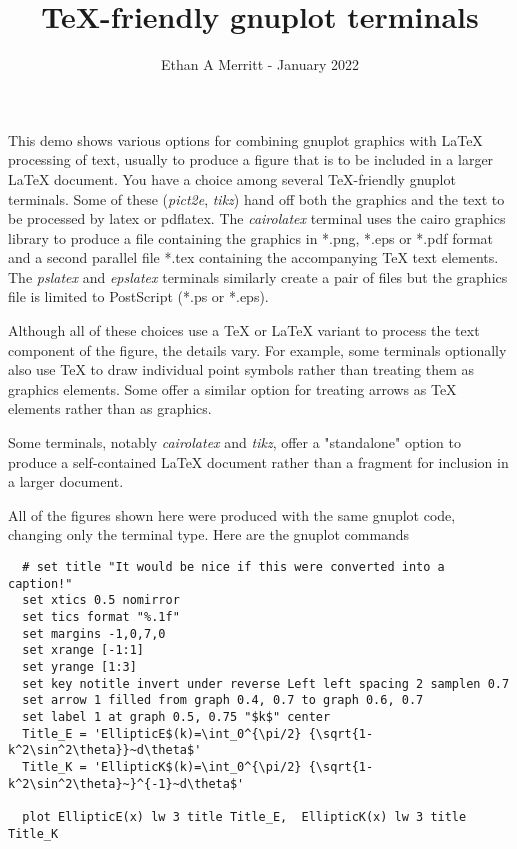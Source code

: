 \documentclass[letterpaper,11pt]{article}
\begin{document}
\title {\vspace{-.75in} \TeX-friendly gnuplot terminals \vspace{-5pt}}
\author{Ethan A Merritt - January 2022}
\date{}
\maketitle

This demo shows various options for combining gnuplot graphics with 
{\LaTeX} processing of text, usually to produce a figure that is to be
included in a larger {\LaTeX} document.
You have a choice among several \TeX-friendly gnuplot terminals.
Some of these ({\em pict2e}, {\em tikz}) hand off both the graphics
and the text to be processed by latex or pdflatex.
The {\em cairolatex} terminal uses the cairo graphics library to produce
a file containing the graphics in *.png, *.eps or *.pdf format and a
second parallel file *.tex containing the accompanying {\TeX} text elements.
The {\em pslatex} and {\em epslatex} terminals similarly create a pair of
files but the graphics file is limited to PostScript (*.ps or *.eps).

Although all of these choices use a {\TeX} or {\LaTeX} variant to process the
text component of the figure, the details vary.  For example,
some terminals optionally also use {\TeX} to draw individual point
symbols rather than treating them as graphics elements. Some
offer a similar option for treating arrows as {\TeX} elements rather
than as graphics.

Some terminals, notably {\em cairolatex} and {\em tikz}, offer a
"standalone" option to produce a self-contained {\LaTeX} document
rather than a fragment for inclusion in a larger document.

All of the figures shown here were produced with the same gnuplot code,
changing only the terminal type.  Here are the gnuplot commands

\begin{framed}
\begin{minipage}{\textwidth}
\begin{verbatim}
  # set title "It would be nice if this were converted into a caption!"
  set xtics 0.5 nomirror
  set tics format "%.1f"
  set margins -1,0,7,0
  set xrange [-1:1]
  set yrange [1:3]
  set key notitle invert under reverse Left left spacing 2 samplen 0.7
  set arrow 1 filled from graph 0.4, 0.7 to graph 0.6, 0.7
  set label 1 at graph 0.5, 0.75 "$k$" center
  Title_E = 'EllipticE$(k)=\int_0^{\pi/2} {\sqrt{1-k^2\sin^2\theta}}~d\theta$'
  Title_K = 'EllipticK$(k)=\int_0^{\pi/2} {\sqrt{1-k^2\sin^2\theta}~}^{-1}~d\theta$'
  
  plot EllipticE(x) lw 3 title Title_E,  EllipticK(x) lw 3 title Title_K
\end{verbatim}
\end{minipage}
\end{framed}
\end{document}
